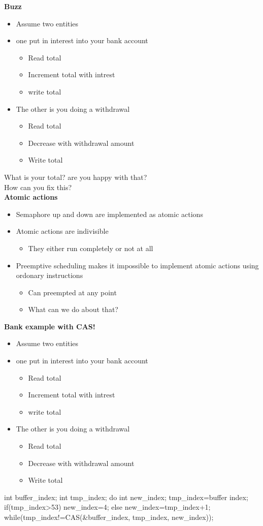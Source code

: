 \textbf{Buzz}
\begin{itemize}
	\item Assume two entities
	\item one put in interest into your bank account
	\begin{itemize}
		\item Read total
		\item Increment total with intrest
		\item write total
	\end{itemize}
	\item The other is you doing a withdrawal
	\begin{itemize}
		\item Read total
		\item Decrease with withdrawal amount
		\item Write total
	\end{itemize}
\end{itemize}
What is your total? are you happy with that?\\
How can you fix this?\\
\textbf{Atomic actions}
\begin{itemize}
\item Semaphore up and down are implemented as atomic actions
\item Atomic actions are indivisible
\begin{itemize}
\item They either run completely or not at all
\end{itemize}
\item Preemptive scheduling makes it impossible to implement atomic actions using ordonary instructions
\begin{itemize}
\item Can preempted at any point
\item What can we do about that?
\end{itemize}
\end{itemize}
\textbf{Bank example with CAS!}
\begin{itemize}
\item Assume two entities
\item one put in interest into your bank account
\begin{itemize}
\item Read total
\item Increment total with intrest
\item write total
\end{itemize}
\item The other is you doing a withdrawal
\begin{itemize}
\item Read total
\item Decrease with withdrawal amount
\item Write total
\end{itemize}
\end{itemize}
\begin{cpp}
int buffer_index;
int tmp_index;
do {
int new_index;
tmp_index=buffer index;
if(tmp_index>53)
 new_index=4;
else
 new_index=tmp_index+1;
 } while(tmp_index!=CAS(&buffer_index, tmp_index, new_index));
\end{cpp}